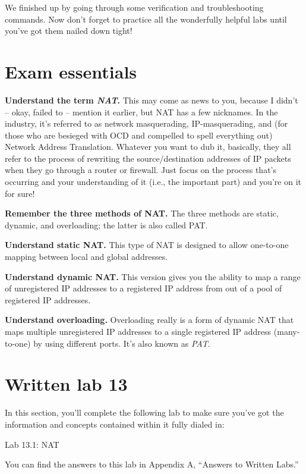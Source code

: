 \documentclass[b5paper,11pt]{memoir}
\begin{document}
We finished up by going through some verification and troubleshooting
commands. Now don't forget to practice all the wonderfully helpful labs
until you've got them nailed down tight!



\section{Exam essentials}

\textbf{Understand the term \emph{NAT}.} This may come as news to you,
because I didn't -- okay, failed to -- mention it earlier, but NAT has a
few nicknames. In the industry, it's referred to as network
masquerading, IP-masquerading, and (for those who are besieged with OCD
and compelled to spell everything out) Network Address Translation.
Whatever you want to dub it, basically, they all refer to the process of
rewriting the source/destination addresses of IP packets when they go
through a router or firewall. Just focus on the process that's occurring
and your understanding of it (i.e., the important part) and you're on it
for sure!

\textbf{Remember the three methods of NAT.} The three methods are
static, dynamic, and overloading; the latter is also called PAT.

\textbf{Understand static NAT.} This type of NAT is designed to allow
one-to-one mapping between local and global addresses.

\textbf{Understand dynamic NAT.} This version gives you the ability to
map a range of unregistered IP addresses to a registered IP address from
out of a pool of registered IP addresses.

\textbf{Understand overloading.} Overloading really is a form of dynamic
NAT that maps multiple unregistered IP addresses to a single registered
IP address (many-to-one) by using different ports. It's also known as
\emph{PAT}.



\section{Written lab 13}

In this section, you'll complete the following lab to make sure you've
got the information and concepts contained within it fully dialed in:

Lab 13.1: NAT

You can find the answers to this lab in Appendix A, ``Answers to Written
Labs.''
\end{document}
